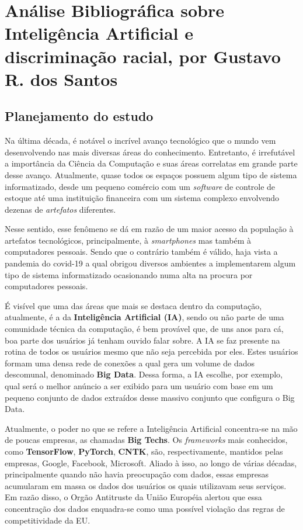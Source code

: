 \chapter{Análise Bibliográfica sobre Inteligência Artificial e discriminação racial, por Gustavo R. dos Santos\label{chap:bibliometria:gutorsantos}}

\section{Planejamento do estudo}

Na última década, é notável o incrível avanço tecnológico que o mundo vem desenvolvendo nas mais diversas áreas do conhecimento. Entretanto, é irrefutável a importância da Ciência da Computação e suas áreas correlatas em grande parte desse avanço. Atualmente, quase todos os espaços possuem algum tipo de sistema informatizado, desde um pequeno comércio com um \textit{software} de controle de estoque até uma instituição financeira com um sistema complexo envolvendo dezenas de \textit{artefatos} diferentes. 

Nesse sentido, esse fenômeno se dá em razão de um maior acesso da população à artefatos tecnológicos, principalmente, à \textit{smartphones} mas também à computadores pessoais. Sendo que o contrário também é válido, haja vista a pandemia do covid-19 a qual obrigou diversos ambientes a implementarem algum tipo de sistema informatizado ocasionando numa alta na procura por computadores pessoais. 

É visível que uma das áreas que mais se destaca dentro da computação, atualmente, é a da \textbf{Inteligência Artificial (IA)}, sendo ou não parte de uma comunidade técnica da computação, é bem provável que, de uns anos para cá, boa parte dos usuários já tenham ouvido falar sobre. A IA se faz presente na rotina de todos os usuários mesmo que não seja percebida por eles. Estes usuários formam uma densa rede de conexões a qual gera um volume de dados descomunal, denominado \textbf{Big Data}. Dessa forma, a IA escolhe, por exemplo, qual será o melhor anúncio a ser exibido para um usuário com base em um pequeno conjunto de dados extraídos desse massivo conjunto que configura o Big Data.

Atualmente, o poder no que se refere a Inteligência Artificial concentra-se na mão de poucas empresas, as chamadas \textbf{Big Techs}. Os \textit{frameworks} mais conhecidos, como \textbf{TensorFlow}, \textbf{PyTorch}, \textbf{CNTK}, são, respectivamente, mantidos pelas empresas, Google, Facebook, Microsoft. Aliado à isso, ao longo de várias décadas, principalmente quando não havia preocupação com dados, essas empresas acumularam em massa os dados dos usuários os quais utilizavam seus serviços. Em razão disso, o Orgão Antitruste da União Européia alertou que essa concentração dos dados enquadra-se como uma possível violação das regras de competitividade da EU.

